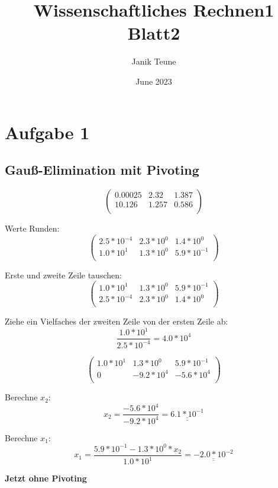 \documentclass{article}
\title{Wissenschaftliches Rechnen1 Blatt2}
\author{Janik Teune}
\date{June 2023}
\newcommand{\dblunderline}[1]{\underline{\underline{#1}}}
\begin{document}
\maketitle

\section{Aufgabe 1}

\subsection{Gauß-Elimination mit Pivoting}

\[
    \left(
    \begin{array}{cc|c}
        0.00025 & 2.32 & 1.387 \\
        10.126 & 1.257 & 0.586 \\
    \end{array}
    \right)
\]

Werte Runden:
\[
    \left(
    \begin{array}{cc|c}
        2.5*10^{-4} & 2.3*10^0 & 1.4*10^0 \\
        1.0*10^1 & 1.3*10^0 & 5.9*10^{-1} \\
    \end{array}
    \right)
\]

Erste und zweite Zeile tauschen:
\[
    \left(
    \begin{array}{cc|c}
        1.0*10^1 & 1.3*10^0 & 5.9*10^{-1} \\
        2.5*10^{-4} & 2.3*10^0 & 1.4*10^0 \\
    \end{array}
    \right)
\]

Ziehe ein Vielfaches der zweiten Zeile von der ersten Zeile ab:
\[
    \frac{1.0*10^1}{2.5*10^{-4}} = 4.0*10^4
\]

\[
    \left(
    \begin{array}{cc|c}
        1.0*10^1 & 1.3*10^0 & 5.9*10^{-1} \\
        0 & -9.2*10^4 & -5.6*10^4 \\
    \end{array}
    \right)
\]

Berechne \(x_2\):
\[
    x_2 = \frac{-5.6*10^4}{-9.2*10^4} = \dblunderline{6.1*10^{-1}}
\]

Berechne \(x_1\):
\[
    x_1 = \frac{5.9*10^{-1} - 1.3*10^0*x_2}{1.0*10^1} =  \dblunderline{-2.0*10^{-2}}
\]

\textbf{Jetzt ohne Pivoting}
\end{document}
